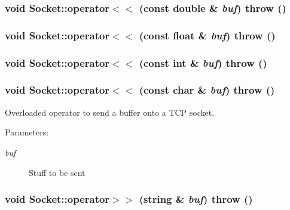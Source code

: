 \hypertarget{classSocket_41b423cfc8d93f8a66de428f8699cdd7}{
\subsubsection[{operator$<$$<$}]{\setlength{\rightskip}{0pt plus 5cm}void Socket::operator$<$$<$ (const double \& {\em buf})  throw ()}}
\label{classSocket_41b423cfc8d93f8a66de428f8699cdd7}


\hypertarget{classSocket_6ea159d9fa113f2e9f5a01f2e29fb295}{
\subsubsection[{operator$<$$<$}]{\setlength{\rightskip}{0pt plus 5cm}void Socket::operator$<$$<$ (const float \& {\em buf})  throw ()}}
\label{classSocket_6ea159d9fa113f2e9f5a01f2e29fb295}


\hypertarget{classSocket_517cbbbff8acd1aff6d8175559bc531f}{
\subsubsection[{operator$<$$<$}]{\setlength{\rightskip}{0pt plus 5cm}void Socket::operator$<$$<$ (const int \& {\em buf})  throw ()}}
\label{classSocket_517cbbbff8acd1aff6d8175559bc531f}


\hypertarget{classSocket_0980ddfd4e759553b20e5e517f2f9fc2}{
\subsubsection[{operator$<$$<$}]{\setlength{\rightskip}{0pt plus 5cm}void Socket::operator$<$$<$ (const char \& {\em buf})  throw ()}}
\label{classSocket_0980ddfd4e759553b20e5e517f2f9fc2}


Overloaded operator to send a buffer onto a TCP socket. 

\begin{Desc}
\item[Parameters:]
\begin{description}
\item[{\em buf}]Stuff to be sent \end{description}
\end{Desc}
\hypertarget{classSocket_fa79720d97b16058c2ce8dad82256ce2}{
\subsubsection[{operator$>$$>$}]{\setlength{\rightskip}{0pt plus 5cm}void Socket::operator$>$$>$ (string \& {\em buf})  throw ()}}
\label{classSocket_fa79720d97b16058c2ce8dad82256ce2}



